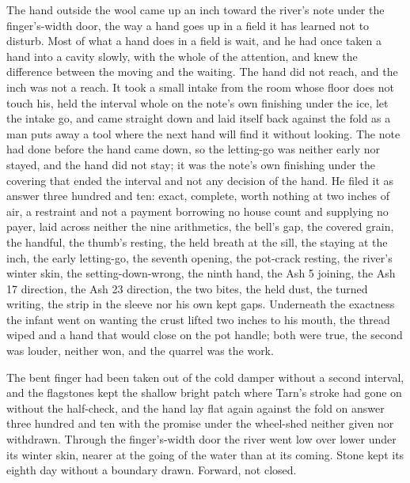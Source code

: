 The hand outside the wool came up an inch toward the river's note under the finger's-width door, the way a hand goes up in a field it has learned not to disturb. Most of what a hand does in a field is wait, and he had once taken a hand into a cavity slowly, with the whole of the attention, and knew the difference between the moving and the waiting. The hand did not reach, and the inch was not a reach. It took a small intake from the room whose floor does not touch his, held the interval whole on the note's own finishing under the ice, let the intake go, and came straight down and laid itself back against the fold as a man puts away a tool where the next hand will find it without looking. The note had done before the hand came down, so the letting-go was neither early nor stayed, and the hand did not stay; it was the note's own finishing under the covering that ended the interval and not any decision of the hand. He filed it as answer three hundred and ten: exact, complete, worth nothing at two inches of air, a restraint and not a payment borrowing no house count and supplying no payer, laid across neither the nine arithmetics, the bell's gap, the covered grain, the handful, the thumb's resting, the held breath at the sill, the staying at the inch, the early letting-go, the seventh opening, the pot-crack resting, the river's winter skin, the setting-down-wrong, the ninth hand, the Ash 5 joining, the Ash 17 direction, the Ash 23 direction, the two bites, the held dust, the turned writing, the strip in the sleeve nor his own kept gaps. Underneath the exactness the infant went on wanting the crust lifted two inches to his mouth, the thread wiped and a hand that would close on the pot handle; both were true, the second was louder, neither won, and the quarrel was the work.

The bent finger had been taken out of the cold damper without a second interval, and the flagstones kept the shallow bright patch where Tarn's stroke had gone on without the half-check, and the hand lay flat again against the fold on answer three hundred and ten with the promise under the wheel-shed neither given nor withdrawn. Through the finger's-width door the river went low over lower under its winter skin, nearer at the going of the water than at its coming. Stone kept its eighth day without a boundary drawn. Forward, not closed.
